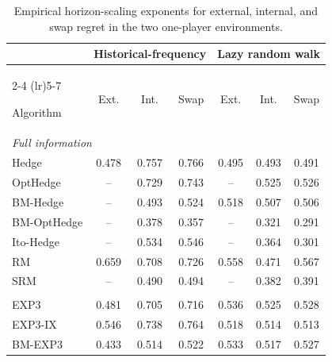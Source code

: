 \begin{table}[H]
    \centering
    \small
    \caption{
        Empirical horizon-scaling exponents for external, internal, and swap
        regret in the two one-player environments.
    }
    \label{tab:regret-scaling}

    \begin{tabular}{lcccccc}
        \toprule
        &
        \multicolumn{3}{c}{Historical-frequency} &
        \multicolumn{3}{c}{Lazy random walk} \\
        \cmidrule(lr){2-4}
        \cmidrule(lr){5-7}

        Algorithm
        & Ext. & Int. & Swap
        & Ext. & Int. & Swap \\
        \midrule

        \multicolumn{7}{l}{\textit{Full information}} \\

        Hedge
        & 0.478 & 0.757 & 0.766
        & 0.495 & 0.493 & 0.491 \\

        OptHedge
        & --    & 0.729 & 0.743
        & --    & 0.525 & 0.526 \\

        BM-Hedge
        & --    & 0.493 & 0.524
        & 0.518 & 0.507 & 0.506 \\

        BM-OptHedge
        & --    & 0.378 & 0.357
        & --    & 0.321 & 0.291 \\

        Ito-Hedge
        & --    & 0.534 & 0.546
        & --    & 0.364 & 0.301 \\

        RM
        & 0.659 & 0.708 & 0.726
        & 0.558 & 0.471 & 0.567 \\

        SRM
        & --    & 0.490 & 0.494
        & --    & 0.382 & 0.391 \\

        \addlinespace
        \multicolumn{7}{l}{\textit{Bandit feedback}} \\

        EXP3
        & 0.481 & 0.705 & 0.716
        & 0.536 & 0.525 & 0.528 \\

        EXP3-IX
        & 0.546 & 0.738 & 0.764
        & 0.518 & 0.514 & 0.513 \\

        BM-EXP3
        & 0.433 & 0.514 & 0.522
        & 0.533 & 0.517 & 0.527 \\


\end{tabular}
\end{table}
